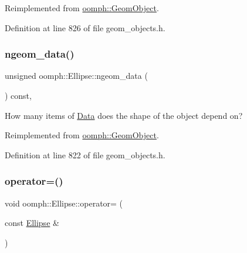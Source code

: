 Reimplemented from \hyperlink{classoomph_1_1GeomObject_ae1940fc6a3050e645c3882f2f6f3a202}{oomph\+::\+Geom\+Object}.



Definition at line 826 of file geom\+\_\+objects.\+h.

\mbox{\label{classoomph_1_1Ellipse_a7b89731ed0bbe563d323d0eb5e1e708c}} 
\subsubsection{\texorpdfstring{ngeom\+\_\+data()}{ngeom\_data()}}
{\footnotesize\ttfamily unsigned oomph\+::\+Ellipse\+::ngeom\+\_\+data (\begin{DoxyParamCaption}{ }\end{DoxyParamCaption}) const\hspace{0.3cm}{\ttfamily [inline]}, {\ttfamily [virtual]}}



How many items of \hyperlink{classoomph_1_1Data}{Data} does the shape of the object depend on? 



Reimplemented from \hyperlink{classoomph_1_1GeomObject_a19d325347e19964e127fe124df56f251}{oomph\+::\+Geom\+Object}.



Definition at line 822 of file geom\+\_\+objects.\+h.

\mbox{\label{classoomph_1_1Ellipse_ab757bc71f6ded401601095c62f751ba4}} 
\subsubsection{\texorpdfstring{operator=()}{operator=()}}
{\footnotesize\ttfamily void oomph\+::\+Ellipse\+::operator= (\begin{DoxyParamCaption}\item[{const \hyperlink{classoomph_1_1Ellipse}{Ellipse} \&}]{ }\end{DoxyParamCaption})\hspace{0.3cm}{\ttfamily [inline]}}



